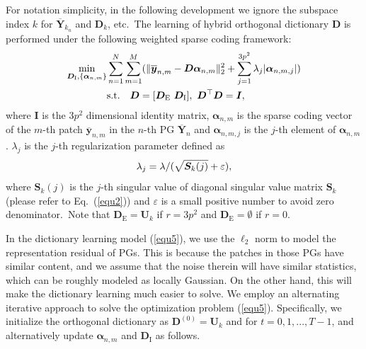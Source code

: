 For notation simplicity, in the following development we ignore the subspace index $k$ for $\bm{\overline{Y}}_{k_{n}}$ and $\bm{D}_{k}$, etc.\ The learning of hybrid orthogonal dictionary $\bm{D}$ is performed under the following weighted sparse coding
framework:
\vspace{-2mm}
\begin{equation}\label{equ5}
\vspace{-2mm}
\begin{split}
\min_{\bm{D}_{\text{I}},\{\bm{\alpha}_{n,m}\}}
&\sum_{n=1}^{N}\sum_{m=1}^{M}(\|\bm{\overline{y}}_{n,m}-\bm{D}\bm{\alpha}_{n,m}\|_{2}^{2}+\sum_{j=1}^{3p^{2}}\lambda_{j}|\bm{\alpha}_{n,m,j}|)
\\
&
\text{s.t.}
\quad
\bm{D}=[\bm{D}_{\text{E}}\ \bm{D}_{\text{I}}],\ \bm{D}^{\top}\bm{D} = \bm{I},
\end{split}
\end{equation}
where $\bm{I}$ is the $3p^{2}$ dimensional identity matrix, $\bm{\alpha}_{n,m}$ is the sparse coding vector of the $m$-th patch $\bm{\overline{y}}_{n,m}$ in the $n$-th PG $\bm{\overline{Y}}_{n}$ and $\bm{\alpha}_{n,m,j}$ is the $j$-th element of $\bm{\alpha}_{n,m}$. $\lambda_{j}$ is the $j$-th regularization parameter defined as
\vspace{-2mm}
\begin{equation}\label{equ6}
\vspace{-2mm}
\lambda_{j} = \lambda/(\sqrt{\bm{S}_{k}(j)}+\varepsilon),
\end{equation}
where $\bm{S}_{k}(j)$ is the $j$-th singular value of diagonal singular value matrix $\bm{S}_{k}$ (please refer to Eq.\ (\ref{equ2})) and $\varepsilon$ is a small positive number to avoid zero denominator.\ Note that $\bm{D}_{\text{E}}=\bm{U}_{k}$ if $r=3p^{2}$ and $\bm{D}_{\text{E}}=\emptyset$ if $r=0$.

In the dictionary learning model (\ref{equ5}), we use the $\ell_{2}$ norm to model the representation residual of PGs. This is because the patches in those PGs have similar content, and we assume that the noise therein will have similar statistics, which can be roughly modeled as locally Gaussian. On the other hand, this will make the dictionary learning much easier to solve. We employ an alternating iterative approach to solve the optimization problem (\ref{equ5}). Specifically, we initialize the orthogonal dictionary as $\bm{D}^{(0)}=\bm{U}_{k}$ and for $t=0,1, ...,T-1$, and alternatively update $\bm{\alpha}_{n,m}$ and $\bm{D}_{\text{I}}$ as follows.

